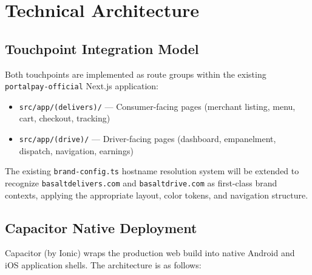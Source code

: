 \documentclass[11pt, letterpaper]{article}
\begin{document}
\section{Technical Architecture}

\subsection{Touchpoint Integration Model}
Both touchpoints are implemented as route groups within the existing \texttt{portalpay-official} Next.js application:

\begin{itemize}
    \item \texttt{src/app/(delivers)/} --- Consumer-facing pages (merchant listing, menu, cart, checkout, tracking)
    \item \texttt{src/app/(drive)/} --- Driver-facing pages (dashboard, empanelment, dispatch, navigation, earnings)
\end{itemize}

The existing \texttt{brand-config.ts} hostname resolution system will be extended to recognize \texttt{basaltdelivers.com} and \texttt{basaltdrive.com} as first-class brand contexts, applying the appropriate layout, color tokens, and navigation structure.

\subsection{Capacitor Native Deployment}
Capacitor (by Ionic) wraps the production web build into native Android and iOS application shells. The architecture is as follows:
\end{document}
